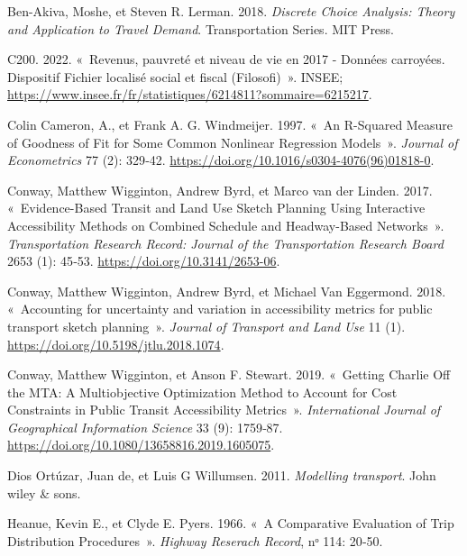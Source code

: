 \documentclass[
  10pt,
  a4paper,
  numbers=noendperiod,
  DIV=9]{scrreprt}
\newlength{\cslhangindent}
\newlength{\cslentryspacingunit} %
\newenvironment{CSLReferences}[2] %
 {%
  \setlength{\parindent}{0pt}
  \ifodd #1
  \let\oldpar\par
  \def\par{\hangindent=\cslhangindent\oldpar}
  \fi
  \setlength{\parskip}{#2\cslentryspacingunit}
 }%
 {}
\begin{document}
\hypertarget{refs}{}
\begin{CSLReferences}{1}{0}
\leavevmode{}%
Ben-Akiva, Moshe, et Steven R. Lerman. 2018. \emph{Discrete Choice
Analysis: Theory and Application to Travel Demand}. Transportation
Series. MIT Press.

\leavevmode{}%
C200. 2022. {«~Revenus, pauvreté et niveau de vie en 2017 - Données
carroyées. Dispositif Fichier localisé social et fiscal (Filosofi)~»}.
INSEE;
\url{https://www.insee.fr/fr/statistiques/6214811?sommaire=6215217}.

\leavevmode{}%
Colin Cameron, A., et Frank A. G. Windmeijer. 1997. {«~An R-Squared
Measure of Goodness of Fit for Some Common Nonlinear Regression
Models~»}. \emph{Journal of Econometrics} 77 (2): 329‑42.
\url{https://doi.org/10.1016/s0304-4076(96)01818-0}.

\leavevmode{}%
Conway, Matthew Wigginton, Andrew Byrd, et Marco van der Linden. 2017.
{«~Evidence-Based Transit and Land Use Sketch Planning Using Interactive
Accessibility Methods on Combined Schedule and Headway-Based
Networks~»}. \emph{Transportation Research Record: Journal of the
Transportation Research Board} 2653 (1): 45‑53.
\url{https://doi.org/10.3141/2653-06}.

\leavevmode{}%
Conway, Matthew Wigginton, Andrew Byrd, et Michael Van Eggermond. 2018.
{«~Accounting for uncertainty and variation in accessibility metrics for
public transport sketch planning~»}. \emph{Journal of Transport and Land
Use} 11 (1). \url{https://doi.org/10.5198/jtlu.2018.1074}.

\leavevmode{}%
Conway, Matthew Wigginton, et Anson F. Stewart. 2019. {«~Getting Charlie
Off the MTA: A Multiobjective Optimization Method to Account for Cost
Constraints in Public Transit Accessibility Metrics~»}.
\emph{International Journal of Geographical Information Science} 33 (9):
1759‑87. \url{https://doi.org/10.1080/13658816.2019.1605075}.

\leavevmode{}%
Dios Ortúzar, Juan de, et Luis G Willumsen. 2011. \emph{Modelling
transport}. John wiley \& sons.

\leavevmode{}%
Heanue, Kevin E., et Clyde E. Pyers. 1966. {«~A Comparative Evaluation
of Trip Distribution Procedures~»}. \emph{Highway Reserach Record}, nᵒ
114: 20‑50.


\end{CSLReferences}
\end{document}
